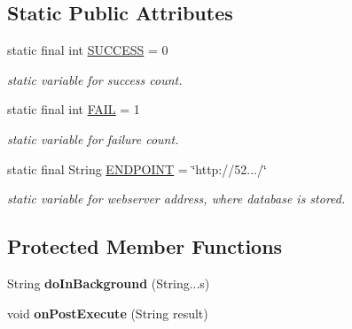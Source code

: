 \subsection*{Static Public Attributes}
\begin{DoxyCompactItemize}
\item 
static final int \hyperlink{classcom_1_1example_1_1sel_1_1lostfound_1_1ScriptRunner_ab5640c236831150ebbea5bf43f3ee3b9}{S\+U\+C\+C\+E\+SS} = 0\hypertarget{classcom_1_1example_1_1sel_1_1lostfound_1_1ScriptRunner_ab5640c236831150ebbea5bf43f3ee3b9}{}\label{classcom_1_1example_1_1sel_1_1lostfound_1_1ScriptRunner_ab5640c236831150ebbea5bf43f3ee3b9}

\begin{DoxyCompactList}\small\item\em static variable for success count. \end{DoxyCompactList}\item 
static final int \hyperlink{classcom_1_1example_1_1sel_1_1lostfound_1_1ScriptRunner_a94833087c5aa3fd8be077df794799ce8}{F\+A\+IL} = 1\hypertarget{classcom_1_1example_1_1sel_1_1lostfound_1_1ScriptRunner_a94833087c5aa3fd8be077df794799ce8}{}\label{classcom_1_1example_1_1sel_1_1lostfound_1_1ScriptRunner_a94833087c5aa3fd8be077df794799ce8}

\begin{DoxyCompactList}\small\item\em static variable for failure count. \end{DoxyCompactList}\item 
static final String \hyperlink{classcom_1_1example_1_1sel_1_1lostfound_1_1ScriptRunner_a6f3af664c21c8bc23d8299c73cd16b46}{E\+N\+D\+P\+O\+I\+NT} = \char`\"{}http\+://52.../\char`\"{}\hypertarget{classcom_1_1example_1_1sel_1_1lostfound_1_1ScriptRunner_a6f3af664c21c8bc23d8299c73cd16b46}{}\label{classcom_1_1example_1_1sel_1_1lostfound_1_1ScriptRunner_a6f3af664c21c8bc23d8299c73cd16b46}

\begin{DoxyCompactList}\small\item\em static variable for webserver address, where database is stored. \end{DoxyCompactList}\end{DoxyCompactItemize}
\subsection*{Protected Member Functions}
\begin{DoxyCompactItemize}
\item 
String {\bfseries do\+In\+Background} (String...\+s)\hypertarget{classcom_1_1example_1_1sel_1_1lostfound_1_1ScriptRunner_a9050c944957b5b8fcacc9d2cba6f3b71}{}\label{classcom_1_1example_1_1sel_1_1lostfound_1_1ScriptRunner_a9050c944957b5b8fcacc9d2cba6f3b71}

\item 
void {\bfseries on\+Post\+Execute} (String result)\hypertarget{classcom_1_1example_1_1sel_1_1lostfound_1_1ScriptRunner_affce5629df2ecd60a45f3c707b996955}{}\label{classcom_1_1example_1_1sel_1_1lostfound_1_1ScriptRunner_affce5629df2ecd60a45f3c707b996955}

\end{DoxyCompactItemize}


